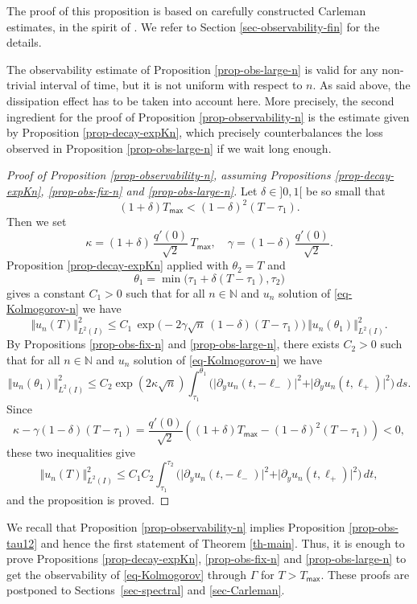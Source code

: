 \documentclass[JEP,XML,SOM,Unicode]{cedram}
\theoremstyle{plain}
\theoremstyle{definition}
\newcommand{\1}{\mathds 1}
\newcommand{\N}{\mathbb{N}}
\let\G\Gamma
\let\th\theta
\newcommand{\Tmax}{T_{\mathsf{max}}}
\begin{document}
The proof of this proposition is based on carefully constructed Carleman estimates, in the spirit of \cite{Beauchard_Darde_Ervedoza}. We refer to Section \ref{sec-observability-fin} for the details.

The observability estimate of Proposition \ref{prop-obs-large-n} is valid for any non-trivial interval of time, but it is not uniform with respect to $n$. As said above, the dissipation effect has to be taken into account here. More precisely, the second ingredient for the proof of Proposition \ref{prop-observability-n} is the estimate given by Proposition \ref{prop-decay-expKn}, which precisely counterbalances the loss observed in Proposition \ref{prop-obs-large-n} if we wait long enough.

\begin{proof}[Proof of Proposition \ref{prop-observability-n}, assuming Propositions \ref{prop-decay-expKn}, \ref{prop-obs-fix-n} and \ref{prop-obs-large-n}]
Let $\delta \in{}]0,1[$ be so small that
\[
(1 +\delta) \Tmax < (1-\delta)^2 (T - \tau_1).
\]
Then we set
\[
\kappa = (1+\delta)\, \frac{q'(0)}{\sqrt{2}}\, \Tmax,
\quad \gamma = (1-\delta)\, \frac{q'(0)}{\sqrt{2}}.
\]
Proposition \ref{prop-decay-expKn} applied with $\th_2 = T$ and
\[
\th_1 = \min\bigl(\tau_1 + \delta (T-\tau_1) , \tau_2 \bigr)
\]
gives a constant $C_1 > 0$ such that for all $n\in \N$ and $u_n$ solution of \eqref{eq-Kolmogorov-n} we have
\[
\Vert u_n (T) \Vert_{L^2(I)}^2 \leq C_1 \, \exp \bigl(-2\gamma \sqrt n\,(1-\delta) (T-\tau_1) \bigr)\, \Vert u_n(\th_1) \Vert_{L^2(I)}^2.
\]
By Propositions \ref{prop-obs-fix-n} and \ref{prop-obs-large-n}, there exists $C_2 > 0$ such that for all $n\in \N$ and $u_n$ solution of \eqref{eq-Kolmogorov-n} we have
\[
\Vert u_n(\th_1) \Vert_{L^2(I)}^2 \leq C_2 \exp(2\kappa \sqrt{n}) {\int_{\tau_1}^{\theta_1}
\bigl(\vert \partial_y u_n(t,-\ell_-)\vert^2 + \vert \partial_y u_n(t,\ell_+) \vert^2 \bigr)\, ds }.
\]
Since
\[
\kappa - \gamma (1-\delta)(T-\tau_1) = \frac{q'(0)}{\sqrt{2}} \left((1+\delta) \Tmax - (1-\delta)^2 (T-\tau_1) \right)< 0,
\]
these two inequalities give
\[
\Vert u_n(T) \Vert_{L^2(I)}^2 \leq C_1C_2 {\int_{\tau_1}^{\tau_2} \bigl(\vert \partial_y u_n(t,-\ell_-)\vert^2 + \vert \partial_y u_n(t,\ell_+) \vert^2 \bigr) \, dt },
\]
and the proposition is proved.
\end{proof}

We recall that Proposition \ref{prop-observability-n} implies Proposition \ref{prop-obs-tau12} and hence the first statement of Theorem \ref{th-main}. Thus, it is enough to prove Propositions \ref{prop-decay-expKn}, \ref{prop-obs-fix-n} and \ref{prop-obs-large-n} to get the observability of \eqref{eq-Kolmogorov} through $\G$ for $T > \Tmax$. These proofs are postponed to Sections~\ref{sec-spectral} and \ref{sec-Carleman}.
\end{document}
